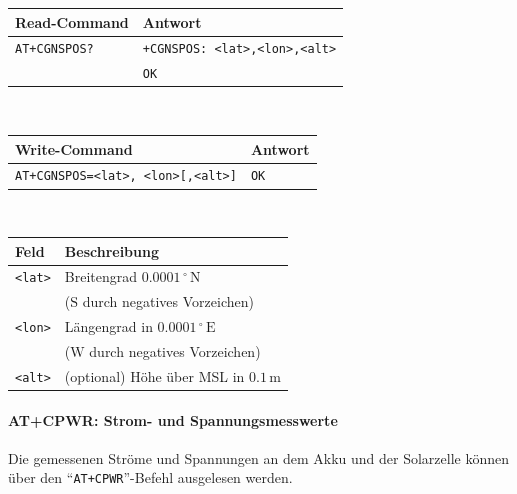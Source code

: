         \begin{table}[H]
            \centering
            \begin{tabular}{|p{}|p{}|}
                \hline
                \textbf{Read-Command} &\textbf{Antwort} \\
                \hline
                \texttt{AT+CGNSPOS?}  & \texttt{+CGNSPOS: <lat>,<lon>,<alt>}\\
                & \texttt{OK}\\
                \hline
            \end{tabular}\\[3mm]
            \begin{tabular}{|p{}|p{}|}
                \hline
                \textbf{Write-Command} &\textbf{Antwort} \\
                \hline
                \texttt{AT+CGNSPOS=<lat>, <lon>[,<alt>]} & \texttt{OK}\\
                \hline
            \end{tabular}\\[3mm]
            \begin{tabular}{|p{}|p{}|}
                \hline
                \textbf{Feld}       & \textbf{Beschreibung}\\
                \hline
                \texttt{<lat>}      & Breitengrad $0.0001\,^\circ\,\mathrm{N}$\\
                                    & ($\mathrm{S}$ durch negatives Vorzeichen)\\
                \texttt{<lon>}      & Längengrad in $0.0001\,^\circ\,\mathrm{E}$\\
                                    & ($\mathrm{W}$ durch negatives Vorzeichen)\\
                \texttt{<alt>}      & (optional) Höhe über MSL in $0.1\,\mathrm{m}$\\
                \hline
            \end{tabular}
        \end{table}
        
        \paragraph{AT+CPWR: Strom- und Spannungsmesswerte}
        Die gemessenen Ströme und Spannungen an dem Akku und der Solarzelle können über den ``\texttt{AT+CPWR}''-Befehl ausgelesen werden.
        
